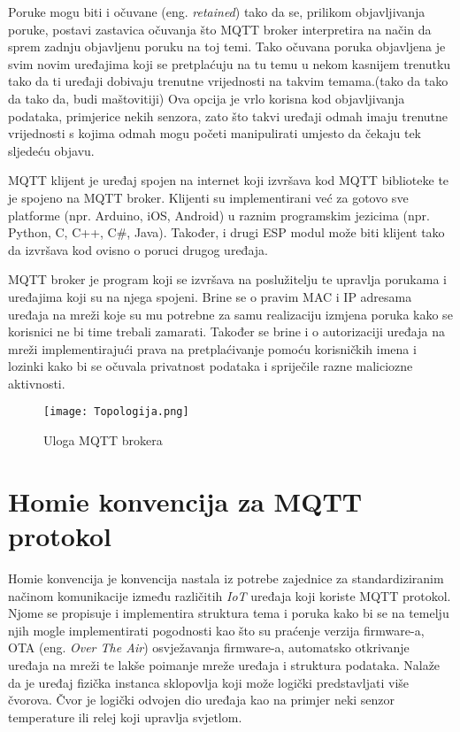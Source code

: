 \documentclass[times, utf8, zavrsni]{fer}
\begin{document}
{Poruke mogu biti i očuvane (eng. \textit{retained}) tako da se, prilikom objavljivanja poruke, postavi zastavica očuvanja što MQTT broker interpretira na način da sprem zadnju objavljenu poruku na toj temi.
Tako očuvana poruka objavljena je svim novim uređajima koji se pretplaćuju na tu temu u nekom kasnijem trenutku tako da ti uređaji dobivaju trenutne vrijednosti na takvim temama.(tako da tako da tako da, budi maštovitiji)
Ova opcija je vrlo korisna kod objavljivanja podataka, primjerice nekih senzora, zato što takvi uređaji odmah imaju trenutne vrijednosti s kojima odmah mogu početi manipulirati umjesto da čekaju tek sljedeću objavu.

MQTT klijent je uređaj spojen na internet koji izvršava kod MQTT biblioteke te je spojeno na MQTT broker.
Klijenti su implementirani već za gotovo sve platforme (npr. Arduino, iOS, Android) u raznim programskim jezicima (npr. Python, C, C++, C\#, Java).
Također, i drugi ESP modul može biti klijent tako da izvršava kod ovisno o poruci drugog uređaja.

MQTT broker je program koji se izvršava na poslužitelju te upravlja porukama i uređajima koji su na njega spojeni.
Brine se o pravim MAC i IP adresama uređaja na mreži koje su mu potrebne za samu realizaciju izmjena poruka kako se korisnici ne bi time trebali zamarati.
Također se brine i o autorizaciji uređaja na mreži implementirajući prava na pretplaćivanje pomoću korisničkih imena i lozinki kako bi se očuvala privatnost podataka i spriječile razne maliciozne aktivnosti.

\begin{figure}[h]
    \centering
    \texttt{[image: Topologija.png]}
    \caption{Uloga MQTT brokera}
\end{figure}

\section{Homie konvencija za MQTT protokol}
Homie konvencija je konvencija nastala iz potrebe zajednice za standardiziranim načinom komunikacije između različitih \textit{IoT} uređaja koji koriste MQTT protokol.
Njome se propisuje i implementira struktura tema i poruka kako bi se na temelju njih mogle implementirati pogodnosti kao što su praćenje verzija firmware-a, OTA (eng. \textit{Over The Air}) osvježavanja firmware-a, automatsko otkrivanje uređaja na mreži te lakše poimanje mreže uređaja i struktura podataka.
Nalaže da je uređaj fizička instanca sklopovlja koji može logički predstavljati više čvorova.
Čvor je logički odvojen dio uređaja kao na primjer neki senzor temperature ili relej koji upravlja svjetlom.

}
\end{document}
